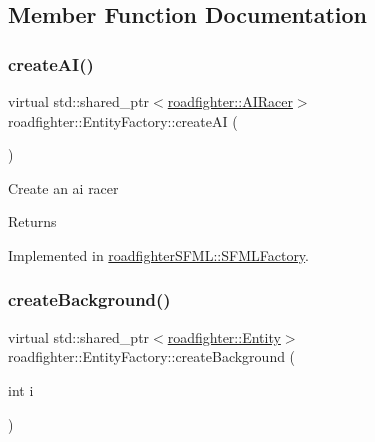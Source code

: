 \subsection{Member Function Documentation}
\mbox{\label{classroadfighter_1_1EntityFactory_ae50d1b8cbf0b63dfbedca775781fbda0}} 
\subsubsection{\texorpdfstring{create\+A\+I()}{createAI()}}
{\footnotesize\ttfamily virtual std\+::shared\+\_\+ptr$<$\hyperlink{classroadfighter_1_1AIRacer}{roadfighter\+::\+A\+I\+Racer}$>$ roadfighter\+::\+Entity\+Factory\+::create\+AI (\begin{DoxyParamCaption}{ }\end{DoxyParamCaption})\hspace{0.3cm}{\ttfamily [pure virtual]}}

Create an ai racer \begin{DoxyReturn}{Returns}

\end{DoxyReturn}


Implemented in \hyperlink{classroadfighterSFML_1_1SFMLFactory_a977a002d878172e485bea8679c136d76}{roadfighter\+S\+F\+M\+L\+::\+S\+F\+M\+L\+Factory}.

\mbox{\label{classroadfighter_1_1EntityFactory_ab3586917a6ef9d3a92b825f908132e02}} 
\subsubsection{\texorpdfstring{create\+Background()}{createBackground()}}
{\footnotesize\ttfamily virtual std\+::shared\+\_\+ptr$<$\hyperlink{classroadfighter_1_1Entity}{roadfighter\+::\+Entity}$>$ roadfighter\+::\+Entity\+Factory\+::create\+Background (\begin{DoxyParamCaption}\item[{int}]{i }\end{DoxyParamCaption})\hspace{0.3cm}{\ttfamily [pure virtual]}}

